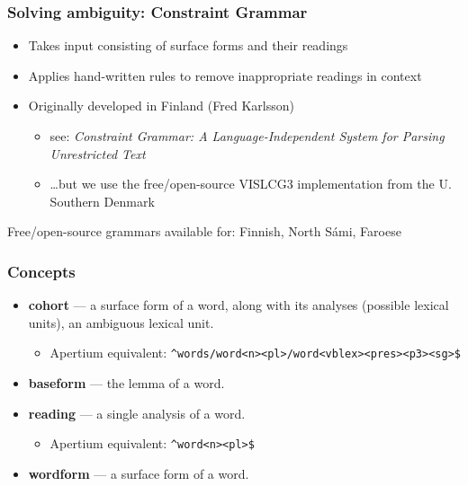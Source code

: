 \documentclass[10pt,xetex]{beamer} %
\begin{document}
\begin{frame}
   \frametitle{Solving ambiguity: Constraint Grammar}

\begin{itemize}
  \item Takes input consisting of surface forms and their readings
  \item Applies hand-written rules to remove inappropriate readings in context
  \item Originally developed in Finland (Fred Karlsson)
  \begin{itemize}
    \item see: \emph{Constraint Grammar: A Language-Independent System for Parsing Unrestricted Text}
    \item \ldots but we use the free/open-source VISLCG3 implementation from the U. Southern Denmark
  \end{itemize}
\end{itemize}

Free/open-source grammars available for: Finnish, North Sámi, Faroese

\end{frame}

\begin{frame}
  \frametitle{Concepts}

\begin{itemize}
  \item  {\bf  cohort} --- a surface form of a word, along with its analyses (possible lexical units), an ambiguous lexical unit.

   \begin{itemize}
         \item  Apertium equivalent: \texttt{\^{}words/word<n><pl>/word<vblex><pres><p3><sg>\$}
   \end{itemize}

    \item {\bf baseform} --- the lemma of a word.
    \item {\bf reading} --- a single analysis of a word.

   \begin{itemize}
        \item Apertium equivalent: \texttt{\^{}word<n><pl>\$}
   \end{itemize}

    \item {\bf wordform} --- a surface form of a word.
\end{itemize}

\end{frame}
\end{document}
